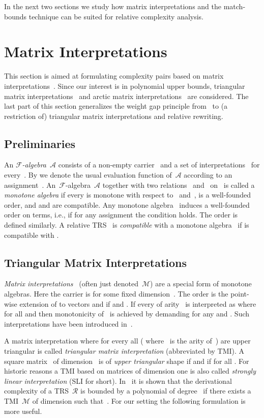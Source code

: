 \documentclass{LMCS}
\theoremstyle{plain}\newtheorem{mainthm}[thm]{Main Theorem}
\newcommand\ALG[1]{\ensuremath{\mathcal{#1}}}
\newcommand\SIG[1]{\ensuremath{\mathcal{#1}}}
\newcommand\TRS[1]{\ensuremath{\mathcal{#1}}}
\newcommand\REL[2]{{\text{\ensuremath{#1 \kern0em/\kern0em #2}}}}
\begin{document}
In the next two sections we study how matrix interpretations and the
match-bounds technique can be suited for relative complexity analysis.

\section{Matrix Interpretations}
\label{MAT:main}

This section is aimed at formulating complexity pairs based on matrix
interpretations~\cite{EWZ08}. Since our interest is in polynomial upper
bounds, triangular matrix interpretations~\cite{MSW08} and arctic matrix
interpretations~\cite{KW08} are considered. The last part of this section
generalizes the weight gap principle from~\cite{HM08} to 
(a restriction of) triangular matrix interpretations and relative rewriting.

\subsection{Preliminaries}

An \emph{\SIG{F}-algebra}~\ALG{A} consists of a non-empty carrier~
and a set of interpretations~ for every~. By
 we denote the usual evaluation function
of~\ALG{A} according to an assignment~.
An~\SIG{F}-algebra~\ALG{A} together with two relations~
and~ on~ is called a \emph{monotone algebra} if
every  is monotone with respect to~ and~,
 is a well-founded order, and  and  are compatible.
Any monotone algebra~ induces a well-founded
order on terms, i.e.,  if for any assignment 
the condition  holds. The
order  is defined similarly.
A relative TRS~ is \emph{compatible} with a
monotone algebra~ if \REL{\TRS{R}}{\TRS{S}}
is compatible with .

\subsection{Triangular Matrix Interpretations}

\emph{Matrix interpretations}~
(often just denoted~\ALG{M}) are a special form of monotone algebras.
Here the carrier is  for some fixed
dimension~. The order
 is the point-wise extension of  to
vectors and
 if  and
. If every  of arity~
is interpreted as
 where  for all
 and  then
monotonicity of~ is achieved by demanding
 for any 
 and 
.
Such interpretations have been introduced in~\cite{EWZ08}.

A matrix interpretation where for every  all 
( where~ is the arity of~)
are upper triangular is called
\emph{triangular matrix interpretation} (abbreviated by TMI).
A square matrix~ of dimension~ is of \emph{upper triangular}
shape if  and  if  for all
.
For historic reasons a TMI based on matrices of dimension one is also
called \emph{strongly linear interpretation} (SLI for short).
In~\cite{MSW08} it is shown that the derivational complexity of
a TRS~\TRS{R} is bounded by a polynomial of degree~ if there
exists a TMI~\ALG{M} of dimension
such that~.
For our setting the following formulation is more useful.
\end{document}
